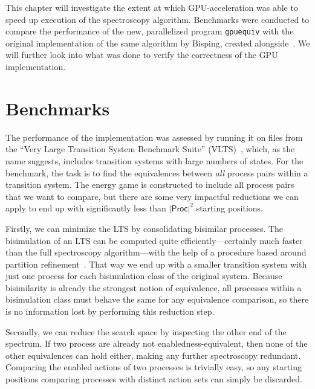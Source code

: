 This chapter will investigate the extent at which GPU-acceleration was able to
speed up execution of the spectroscopy algorithm.
Benchmarks were conducted to compare the performance of the new,
parallelized program \texttt{gpuequiv}
with the original implementation of the same algorithm by Bisping,
created alongside~\cite{bisping2023process}.
We will further look into what was done to verify the correctness of the GPU
implementation.

\section{Benchmarks}

The performance of the implementation was assessed by running it on files from
the \enquote{Very Large Transition System Benchmark Suite} (VLTS)~\cite{vlts},
which, as the name suggests,
includes transition systems with large numbers of states.
For the benchmark, the task is to find the equivalences between \emph{all}
process pairs within a transition system.
The energy game is constructed to include all process pairs that we want to
compare,
but there are some very impactful reductions we can apply to end up with
significantly less than $|\mathsf{Proc}|^2$ starting positions.

Firstly, we can minimize the LTS by consolidating bisimilar processes.
The bisimulation of an LTS can be computed quite efficiently---certainly much
faster than the full spectroscopy algorithm---with the help of a procedure
based around partition refinement~\cite{Blom2002}.
That way we end up with a smaller transition system with just one process for
each bisimulation class of the original system.
Because bisimilarity is already the strongest notion of equivalence,
all processes within a bisimulation class must behave the same for any
equivalence comparison,
so there is no information lost by performing this reduction step.

Secondly,
we can reduce the search space by inspecting the other end of the spectrum.
If two process are already not enabledness-equivalent,
then none of the other equivalences can hold either,
making any further spectroscopy redundant.
Comparing the enabled actions of two processes is trivially easy,
so any starting positions comparing processes with distinct action sets
can simply be discarded.

